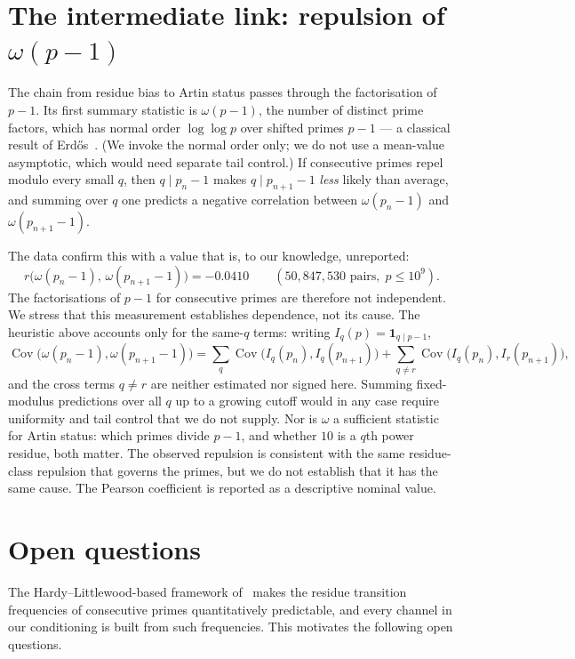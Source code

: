 \documentclass[11pt]{amsart}
\theoremstyle{definition}
\begin{document}
\section{The intermediate link: repulsion of \texorpdfstring{$\omega(p-1)$}{omega(p-1)}}
\label{sec:omega}

The chain from residue bias to Artin status passes through the factorisation
of $p - 1$. Its first summary statistic is
$\omega(p-1)$, the number of distinct prime factors, which has normal order
$\log\log p$ over shifted primes $p - 1$ --- a classical result of
Erd\H{o}s~\cite{Erdos1935}. (We invoke the normal order only; we do not use a
mean-value asymptotic, which would need separate tail control.) If consecutive primes repel modulo every small
$q$, then $q \mid p_n - 1$ makes $q \mid p_{n+1} - 1$ \emph{less} likely than
average, and summing over $q$ one predicts a negative correlation between
$\omega(p_n - 1)$ and $\omega(p_{n+1} - 1)$.

The data confirm this with a value that is, to our knowledge, unreported:
\[
	r\bigl(\omega(p_n - 1),\, \omega(p_{n+1} - 1)\bigr) = -0.0410
	\qquad (50{,}847{,}530 \text{ pairs}, \; p \le 10^9).
\]
The factorisations of $p - 1$ for consecutive primes are therefore not
independent. We stress that this measurement establishes dependence, not its
cause. The heuristic above accounts only for the same-$q$ terms: writing
$I_q(p) = \mathbf{1}_{q \mid p-1}$,
\[
  \operatorname{Cov}\bigl(\omega(p_n-1), \omega(p_{n+1}-1)\bigr)
  = \sum_q \operatorname{Cov}\bigl(I_q(p_n), I_q(p_{n+1})\bigr)
  + \sum_{q \ne r} \operatorname{Cov}\bigl(I_q(p_n), I_r(p_{n+1})\bigr),
\]
and the cross terms $q \ne r$ are neither estimated nor signed here. Summing
fixed-modulus predictions over all $q$ up to a growing cutoff would in any case
require uniformity and tail control that we do not supply. Nor is $\omega$ a
sufficient statistic for Artin status: which primes divide $p-1$, and whether
$10$ is a $q$th power residue, both matter. The observed repulsion is
consistent with the same residue-class repulsion that governs the primes, but
we do not establish that it has the same cause. The Pearson coefficient is
reported as a descriptive nominal value.

\section{Open questions}
\label{sec:questions}

The Hardy--Littlewood-based framework of~\cite{LOS2016} makes the residue
transition frequencies of consecutive primes quantitatively predictable, and
every channel in our conditioning is built from such frequencies. This
motivates the following open questions.
\end{document}
